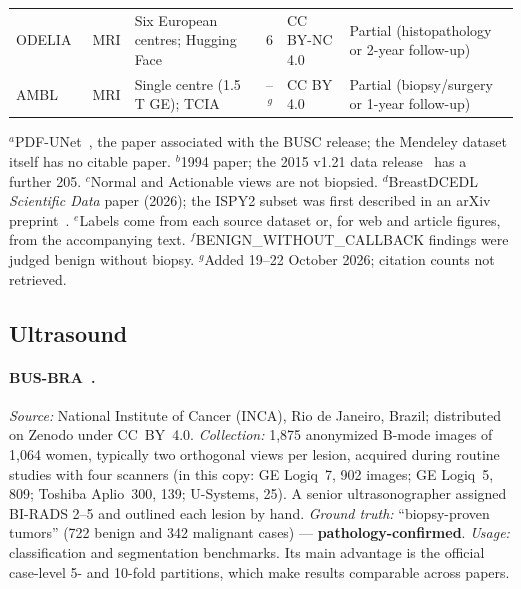 \documentclass[11pt]{article}
\begin{document}
\begin{table}[!htbp]
\begin{tabularx}{\textwidth}{@{}l l Y r L{2.0cm} L{2.6cm}@{}}
    ODELIA~\citep{mullerfranzes2025odelia} & MRI & Six European centres; Hugging Face & 6 & CC BY-NC 4.0 & Partial (histopathology or 2-year follow-up) \\
    AMBL~\citep{daniels2024ambl} & MRI & Single centre (1.5\,T GE); TCIA & --$^{g}$ & CC BY 4.0 & Partial (biopsy/surgery or 1-year follow-up) \\
    \bottomrule
  \end{tabularx}
  \par\smallskip\footnotesize
  $^{a}$PDF-UNet~\citep{iqbalsharif2023pdfunet}, the paper associated with the BUSC release; the Mendeley dataset itself has no citable paper.
  $^{b}$1994 paper; the 2015 v1.21 data release~\citep{suckling2015miasv121} has a further 205.
  $^{c}$Normal and Actionable views are not biopsied.
  $^{d}$BreastDCEDL \emph{Scientific Data} paper (2026); the ISPY2 subset was first described in an arXiv preprint~\citep{fridman2025breastdcedl}.
  $^{e}$Labels come from each source dataset or, for web and article figures, from the accompanying text.
  $^{f}$BENIGN\_WITHOUT\_CALLBACK findings were judged benign without biopsy.
  $^{g}$Added 19--22 October 2026; citation counts not retrieved.
\end{table}

\subsection{Ultrasound}

\paragraph{BUS-BRA~\citep{gomezflores2024busbra}.}
\emph{Source:} National Institute of Cancer (INCA), Rio de Janeiro, Brazil;
distributed on Zenodo under CC~BY~4.0. \emph{Collection:} 1,875 anonymized
B-mode images of 1,064 women, typically two orthogonal views per lesion,
acquired during routine studies with four scanners (in this copy: GE Logiq~7,
902 images; GE Logiq~5, 809; Toshiba Aplio~300, 139; U-Systems, 25). A senior
ultrasonographer assigned BI-RADS 2--5 and outlined each lesion by hand.
\emph{Ground truth:} ``biopsy-proven tumors'' (722 benign and 342 malignant
cases) --- \textbf{pathology-confirmed}. \emph{Usage:} classification and
segmentation benchmarks. Its main advantage is the official case-level 5- and
10-fold partitions, which make results comparable across papers.
\end{document}
